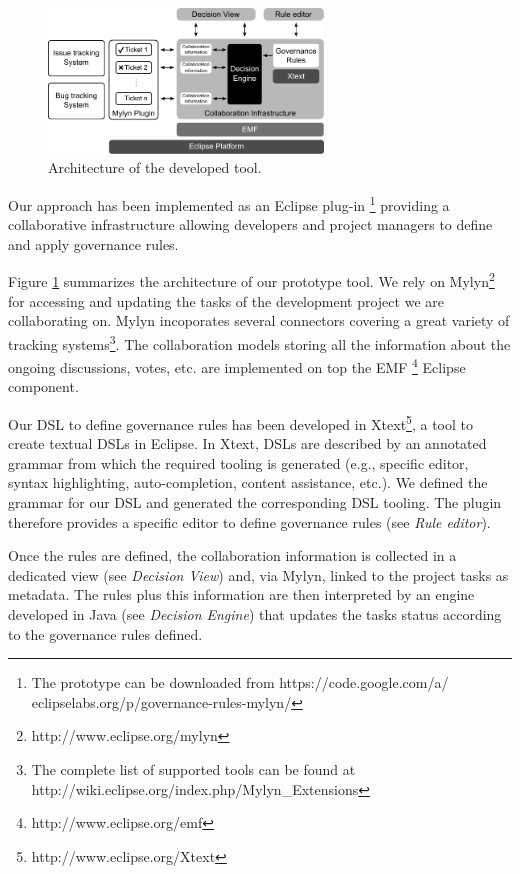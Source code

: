 \begin{figure}[t] 
  \centering
  \includegraphics[width=0.65\textwidth]{./figures/architecture}
  \caption{Architecture of the developed tool.}
  \label{fig:architecture}
\end{figure}


Our approach has been implemented as an Eclipse plug-in \footnote{The prototype can be downloaded from https://code.google.com/a/ eclipselabs.org/p/governance-rules-mylyn/} providing a collaborative infrastructure allowing developers and project managers to define and apply governance rules. 

Figure \ref{fig:architecture} summarizes the architecture of our prototype tool. We rely on Mylyn\footnote{http://www.eclipse.org/mylyn} for accessing and updating the tasks of the development project we are collaborating on. Mylyn incoporates several connectors covering a great variety of tracking systems\footnote{The complete list of supported tools can be found at http://wiki.eclipse.org/index.php/Mylyn\_Extensions}. The collaboration models storing all the information about the ongoing discussions, votes, etc. are implemented on top the EMF \footnote{http://www.eclipse.org/emf} Eclipse component. 

Our DSL to define governance rules has been developed in Xtext\footnote{http://www.eclipse.org/Xtext}, a tool to create textual DSLs in Eclipse. In Xtext, DSLs are described by an annotated grammar from which the required tooling is generated (e.g., specific editor, syntax highlighting, auto-completion, content assistance, etc.). We defined the grammar for our DSL and generated the corresponding DSL tooling. The plugin therefore provides a specific editor to define governance rules (see \emph{Rule editor}). 

Once the rules are defined, the collaboration information is collected in a dedicated view (see \emph{Decision View}) and, via Mylyn, linked to the project tasks as metadata. The rules plus this information are then interpreted by an engine developed in Java (see \emph{Decision Engine}) that updates the tasks status according to the governance rules defined.


